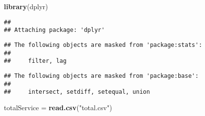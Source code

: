 \documentclass[]{article}
\title{}
\author{}
\date{}
\newenvironment{Shaded}{\begin{snugshade}}{\end{snugshade}}
\newcommand{\KeywordTok}[1]{\textcolor[rgb]{0.13,0.29,0.53}{\textbf{#1}}}
\newcommand{\StringTok}[1]{\textcolor[rgb]{0.31,0.60,0.02}{#1}}
\newcommand{\NormalTok}[1]{#1}
\begin{document}
\begin{Shaded}
\begin{Highlighting}[]
\KeywordTok{library}\NormalTok{(dplyr)}
\end{Highlighting}
\end{Shaded}

\begin{verbatim}
## 
## Attaching package: 'dplyr'
\end{verbatim}

\begin{verbatim}
## The following objects are masked from 'package:stats':
## 
##     filter, lag
\end{verbatim}

\begin{verbatim}
## The following objects are masked from 'package:base':
## 
##     intersect, setdiff, setequal, union
\end{verbatim}

\begin{Shaded}
\begin{Highlighting}[]
\NormalTok{totalService =}\StringTok{ }\KeywordTok{read.csv}\NormalTok{(}\StringTok{"total.csv"}\NormalTok{)}
\end{Highlighting}
\end{Shaded}
\end{document}
